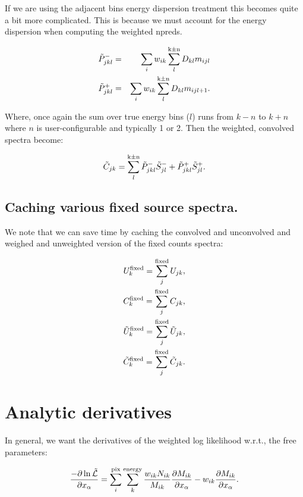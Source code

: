 \documentclass[preprint]{aastex}
\begin{document}
If we are using the adjacent bins energy dispersion treatment this becomes quite
a bit more complicated.  This is because we must account for the energy dispersion when
computing the weighted npreds.  

\begin{eqnarray}
  \tilde{P}_{jkl}^{-} & = & \sum_i w_{ik} \sum_l^{\rm k\pm n} D_{kl} m_{ijl} \nonumber \\
  \tilde{P}_{jkl}^{+} & = & \sum_i w_{ik} \sum_l^{\rm k\pm n} D_{kl} m_{ijl+1}. 
\end{eqnarray}

\noindent Where, once again the sum over true energy bins ($l$) runs from $k-n$ to $k+n$ where $n$ is user-configurable and
typically 1 or 2.  Then the weighted, convolved spectra become:

\begin{equation}
  \tilde{C}_{jk} = \sum_l^{\rm k\pm n} \tilde{P}_{jkl}^{-}  \tilde{S}_{jl}^{-}  + \tilde{P}_{jkl}^{+} \tilde{S}_{jl}^{+}.
\end{equation}


\subsection{Caching various fixed source spectra.}\label{subsec:like_sum2}

We note that we can save time by caching the
convolved and unconvolved and weighed and unweighted version of the fixed counts spectra:

\begin{eqnarray}
  U_{k}^{\rm fixed} = \sum_j^{\rm fixed} U_{jk},  \nonumber \\
  C_{k}^{\rm fixed} = \sum_j^{\rm fixed} C_{jk},  \nonumber \\
  \tilde{U}_{k}^{\rm fixed} = \sum_j^{\rm fixed} \tilde{U}_{jk},  \nonumber \\
  \tilde{C}_{k}^{\rm fixed} = \sum_j^{\rm fixed} \tilde{C}_{jk}. 
\end{eqnarray}


\section{Analytic derivatives}\label{sec:derivatives}

In general, we want the derivatives of the weighted log likelihood w.r.t.,
the free parameters:

\begin{equation}\label{eq:derivatives}
  \frac{-\partial \ln \tilde{\mathcal{L}}}{\partial x_{\alpha}} = \sum_i^{\rm pix} \sum_k^{\rm energy} \frac{w_{ik} N_{ik}}{M_{ik}} \frac{\partial M_{ik}}{\partial x_{\alpha}} - w_{ik} \frac{\partial M_{ik}}{\partial x_{\alpha}}.
\end{equation}
\end{document}

